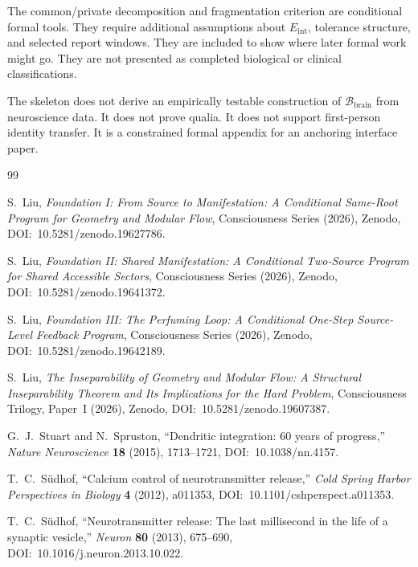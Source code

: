 \documentclass[12pt]{article}
\theoremstyle{definition}
\theoremstyle{remark}
\newcommand{\Bbrain}{\mathcal B_{\mathrm{brain}}}
\begin{document}
The common/private decomposition and fragmentation criterion are
conditional formal tools. They require additional assumptions about
\(E_{\mathrm{int}}\), tolerance structure, and selected report windows.
They are included to show where later formal work might go. They are
not presented as completed biological or clinical classifications.

The skeleton does not derive an empirically testable construction of
\(\Bbrain\) from neuroscience data. It does not prove qualia. It does
not support first-person identity transfer. It is a constrained formal
appendix for an anchoring interface paper.

\newpage
{}

\begin{thebibliography}{99}
\sloppy
\raggedright

S.~Liu,
\emph{Foundation I: From Source to Manifestation: A Conditional Same-Root Program for Geometry and Modular Flow},
Consciousness Series (2026),
Zenodo, DOI:~10.5281/zenodo.19627786.

S.~Liu,
\emph{Foundation II: Shared Manifestation: A Conditional Two-Source Program for Shared Accessible Sectors},
Consciousness Series (2026),
Zenodo, DOI:~10.5281/zenodo.19641372.

S.~Liu,
\emph{Foundation III: The Perfuming Loop: A Conditional One-Step Source-Level Feedback Program},
Consciousness Series (2026),
Zenodo, DOI:~10.5281/zenodo.19642189.

S.~Liu,
\emph{The Inseparability of Geometry and Modular Flow: A Structural Inseparability Theorem and Its Implications for the Hard Problem},
Consciousness Trilogy, Paper~I (2026),
Zenodo, DOI:~10.5281/zenodo.19607387.

G.~J.~Stuart and N.~Spruston,
``Dendritic integration: 60 years of progress,''
\emph{Nature Neuroscience} \textbf{18} (2015), 1713--1721,
DOI:~10.1038/nn.4157.

T.~C.~S{\"u}dhof,
``Calcium control of neurotransmitter release,''
\emph{Cold Spring Harbor Perspectives in Biology} \textbf{4} (2012),
a011353,
DOI:~10.1101/cshperspect.a011353.

T.~C.~S{\"u}dhof,
``Neurotransmitter release: The last millisecond in the life of a
synaptic vesicle,''
\emph{Neuron} \textbf{80} (2013), 675--690,
DOI:~10.1016/j.neuron.2013.10.022.


\end{thebibliography}
\end{document}
